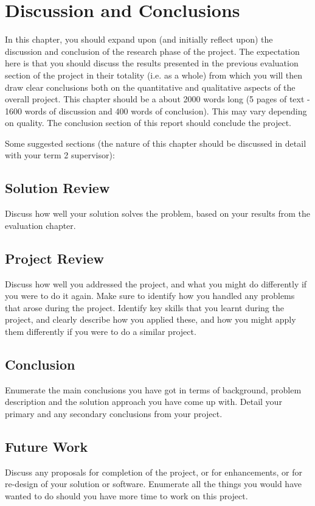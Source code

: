 \chapter{Discussion and Conclusions}
\label{chap:conclusions}
In this chapter, you should expand upon (and initially reflect upon) the discussion and conclusion of the research phase of the project. The expectation here is that you should discuss the results presented in the previous evaluation section of the project in their totality (i.e. as a whole) from which you will then draw clear conclusions both on the quantitative and qualitative aspects of the overall project. This chapter should be a about 2000 words long (5 pages of text - 1600 words of discussion and 400 words of conclusion). This may vary depending on quality. The conclusion section of this report should conclude the project.

Some suggested sections (the nature of this chapter should be discussed in detail with your term 2 supervisor):

\section{Solution Review}
Discuss how well your solution solves the problem, based on your results from the evaluation chapter.

\section{Project Review}
Discuss how well you addressed the project, and what you might do differently if you were to do it again. Make sure to identify how you handled any problems that arose during the project. Identify key skills that you learnt during the project, and clearly describe how you applied these, and how you might apply them differently if you were to do a similar project.

\section{Conclusion}
Enumerate the main conclusions you have got in terms of background, problem description and the solution approach you have come up with. Detail your primary and any secondary conclusions from your project.

\section{Future Work}
Discuss any proposals for completion of the project, or for enhancements, or for re-design of your solution or software. Enumerate all the things you would have wanted to do should you have more time to work on this project.